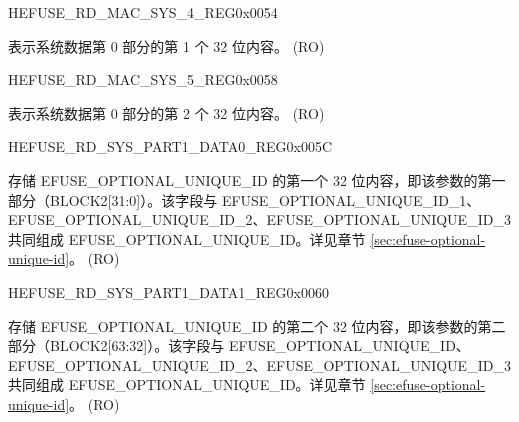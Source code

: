 \begin{register}{H}{EFUSE\_RD\_MAC\_SYS\_4\_REG}{0x0054}\label{regdesc:EFUSERDMACSYS4REG}
%
\regnewline%
\begin{regdesc}\begin{reglist}
\label{fielddesc:EFUSESYSDATAPART01}\item [EFUSE\_SYS\_DATA\_PART0\_1] 表示系统数据第 0 部分的第 1 个 32 位内容。 (RO)
\end{reglist}\end{regdesc}
\end{register}


\begin{register}{H}{EFUSE\_RD\_MAC\_SYS\_5\_REG}{0x0058}\label{regdesc:EFUSERDMACSYS5REG}
%
\regnewline%
\begin{regdesc}\begin{reglist}
\label{fielddesc:EFUSESYSDATAPART02}\item [EFUSE\_SYS\_DATA\_PART0\_2] 表示系统数据第 0 部分的第 2 个 32 位内容。 (RO)
\end{reglist}\end{regdesc}
\end{register}


\begin{register}{H}{EFUSE\_RD\_SYS\_PART1\_DATA0\_REG}{0x005C}\label{regdesc:EFUSERDSYSPART1DATA0REG}
%
\regnewline%
\begin{regdesc}\begin{reglist}
\label{fielddesc:EFUSEOPTIONALUNIQUEID}\item [EFUSE\_OPTIONAL\_UNIQUE\_ID] 存储 EFUSE\_OPTIONAL\_UNIQUE\_ID 的第一个 32 位内容，即该参数的第一部分（BLOCK2[31:0]）。该字段与 EFUSE\_OPTIONAL\_UNIQUE\_ID\_1、EFUSE\_OPTIONAL\_UNIQUE\_ID\_2、EFUSE\_OPTIONAL\_UNIQUE\_ID\_3 共同组成 EFUSE\_OPTIONAL\_UNIQUE\_ID。详见章节 \ref{sec:efuse-optional-unique-id}。 (RO)
\end{reglist}\end{regdesc}
\end{register}


\begin{register}{H}{EFUSE\_RD\_SYS\_PART1\_DATA1\_REG}{0x0060}\label{regdesc:EFUSERDSYSPART1DATA1REG}
%
\regnewline%
\begin{regdesc}\begin{reglist}
\label{fielddesc:EFUSEOPTIONALUNIQUEID1}\item [EFUSE\_OPTIONAL\_UNIQUE\_ID\_1] 存储 EFUSE\_OPTIONAL\_UNIQUE\_ID 的第二个 32 位内容，即该参数的第二部分（BLOCK2[63:32]）。该字段与 EFUSE\_OPTIONAL\_UNIQUE\_ID、EFUSE\_OPTIONAL\_UNIQUE\_ID\_2、EFUSE\_OPTIONAL\_UNIQUE\_ID\_3 共同组成 EFUSE\_OPTIONAL\_UNIQUE\_ID。详见章节 \ref{sec:efuse-optional-unique-id}。 (RO)
\end{reglist}\end{regdesc}
\end{register}


